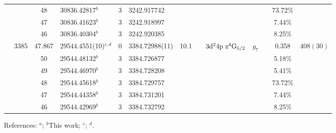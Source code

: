 \begin{table*}
\begin{center}
{\begin{tabular}{:l;l;c;l;c;l;c;l;l;c;c;c;c}
\rowstyle{\itshape}               &        & 48        & 30836.42817$^{b}$                & 3 &   3242.917742      &      & $                                        $ & $                                        $ & $      $ &              & 73.72\%   & $          $\\
\rowstyle{\itshape}               &        & 47        & 30836.41623$^{b}$                & 3 &   3242.918997      &      & $                                        $ & $                                        $ & $      $ &              & 7.44\%    & $          $\\
\rowstyle{\itshape}               &        & 46        & 30836.40304$^{b}$                & 3 &   3242.920385      &      & $                                        $ & $                                        $ & $      $ &              & 8.25\%    & $          $\\
                                  & 3385   & 47.867    & 29544.4551(10)$^{c,d}$           & 0 &    3384.72988(11)  & 10.1 & $                                        $ & $3\rm{d}^24\rm{p~z}^4\rm{G}_{5/2}        $ & $g_{7} $ &              & 0.358     & $  408(30) $\\
\rowstyle{\itshape}               &        & 50        & 29544.48132$^{b}$                & 3 &   3384.726877      &      & $                                        $ & $                                        $ & $      $ &              & 5.18\%    & $          $\\
\rowstyle{\itshape}               &        & 49        & 29544.46970$^{b}$                & 3 &   3384.728208      &      & $                                        $ & $                                        $ & $      $ &              & 5.41\%    & $          $\\
\rowstyle{\itshape}               &        & 48        & 29544.45618$^{b}$                & 3 &   3384.729757      &      & $                                        $ & $                                        $ & $      $ &              & 73.72\%   & $          $\\
\rowstyle{\itshape}               &        & 47        & 29544.44358$^{b}$                & 3 &   3384.731201      &      & $                                        $ & $                                        $ & $      $ &              & 7.44\%    & $          $\\
\rowstyle{\itshape}               &        & 46        & 29544.42969$^{b}$                & 3 &   3384.732792      &      & $                                        $ & $                                        $ & $      $ &              & 8.25\%    & $          $\\
\hline
\end{tabular}
}
{\footnotesize References:
$^{a}$\citet{Ruffoni:2010:424};
$^{b}$This work;
$^{c}$\citet{Aldenius:2009:014008};
$^{d}$\citet{Nave:2012:1570}.}
\end{center}
\end{table*}
